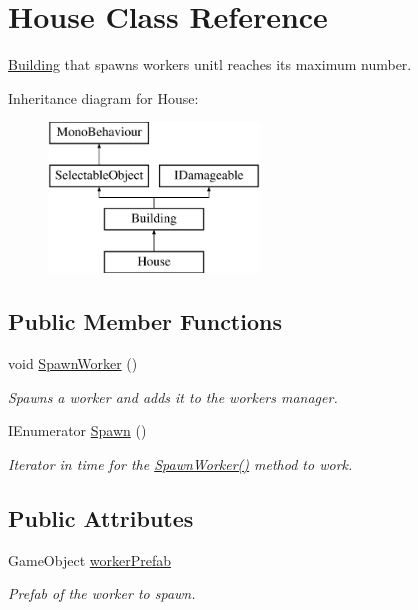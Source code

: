 \hypertarget{class_house}{}\section{House Class Reference}
\label{class_house}


\mbox{\hyperlink{class_building}{Building}} that spawns workers unitl reaches its maximum number.  


Inheritance diagram for House\+:\begin{figure}[H]
\begin{center}
\leavevmode
\includegraphics[height=4.000000cm]{class_house}
\end{center}
\end{figure}
\subsection*{Public Member Functions}
\begin{DoxyCompactItemize}
\item 
void \mbox{\hyperlink{class_house_a695e452216051b76e8f2eb15f3ed956d}{Spawn\+Worker}} ()
\begin{DoxyCompactList}\small\item\em Spawns a worker and adds it to the workers manager. \end{DoxyCompactList}\item 
I\+Enumerator \mbox{\hyperlink{class_house_a51ddcc23a76d4731dc74d26d11dc3240}{Spawn}} ()
\begin{DoxyCompactList}\small\item\em Iterator in time for the \mbox{\hyperlink{class_house_a695e452216051b76e8f2eb15f3ed956d}{Spawn\+Worker()}} method to work. \end{DoxyCompactList}\end{DoxyCompactItemize}
\subsection*{Public Attributes}
\begin{DoxyCompactItemize}
\item 
Game\+Object \mbox{\hyperlink{class_house_a372877c84935b2aa6e7968099c6619d7}{worker\+Prefab}}
\begin{DoxyCompactList}\small\item\em Prefab of the worker to spawn. \end{DoxyCompactList}\end{DoxyCompactItemize}
